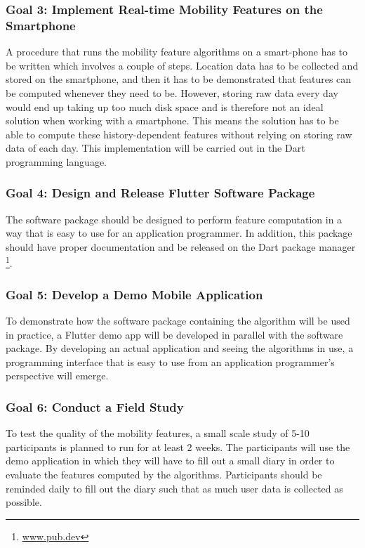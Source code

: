 \subsubsection*{Goal 3: Implement Real-time Mobility Features on the Smartphone}
A procedure that runs the mobility feature algorithms on a smart-phone has to be written which involves a couple of steps. Location data has to be collected and stored on the smartphone, and then it has to be demonstrated that features can be computed whenever they need to be. However, storing raw data every day would end up taking up too much disk space and is therefore not an ideal solution when working with a smartphone. This means the solution has to be able to compute these history-dependent features without relying on storing raw data of each day. This implementation will be carried out in the Dart programming language.

\subsubsection*{Goal 4: Design and Release Flutter Software Package}
The software package should be designed to perform feature computation in a way that is easy to use for an application programmer. In addition, this package should have proper documentation and be released on the Dart package manager \footnote{\url{www.pub.dev}}.

\subsubsection*{Goal 5: Develop a Demo Mobile Application}
To demonstrate how the software package containing the algorithm will be used in practice, a Flutter demo app will be developed in parallel with the software package. By developing an actual application and seeing the algorithms in use, a programming interface that is easy to use from an application programmer's perspective will emerge.

\subsubsection*{Goal 6: Conduct a Field Study}
To test the quality of the mobility features, a small scale study of 5-10 participants is planned to run for at least 2 weeks. The participants will use the demo application in which they will have to fill out a small diary in order to evaluate the features computed by the algorithms. Participants should be reminded daily to fill out the diary such that as much user data is collected as possible.

